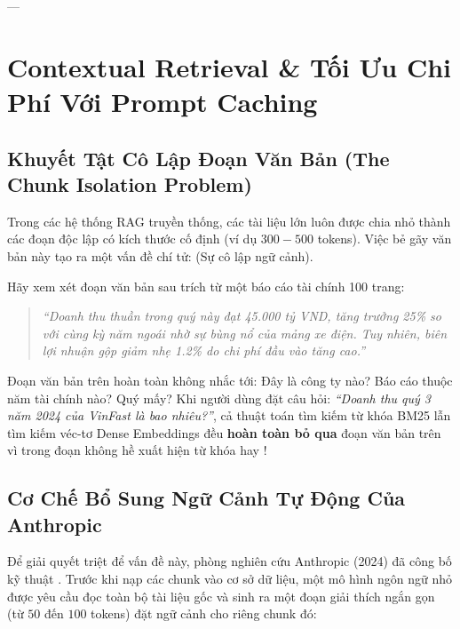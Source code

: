 ---

\section{Contextual Retrieval \& Tối Ưu Chi Phí Với Prompt Caching}
\label{sec:contextual-retrieval}

\subsection{Khuyết Tật Cô Lập Đoạn Văn Bản (The Chunk Isolation Problem)}
Trong các hệ thống RAG truyền thống, các tài liệu lớn luôn được chia nhỏ thành các đoạn độc lập có kích thước cố định (ví dụ $300 - 500$ tokens). Việc bẻ gãy văn bản này tạo ra một vấn đề chí tử:  (Sự cô lập ngữ cảnh).

Hãy xem xét đoạn văn bản sau trích từ một báo cáo tài chính 100 trang:
\begin{quote}\itshape
``Doanh thu thuần trong quý này đạt 45.000 tỷ VND, tăng trưởng 25\% so với cùng kỳ năm ngoái nhờ sự bùng nổ của mảng xe điện. Tuy nhiên, biên lợi nhuận gộp giảm nhẹ 1.2\% do chi phí đầu vào tăng cao.''
\end{quote}
Đoạn văn bản trên hoàn toàn không nhắc tới: Đây là công ty nào? Báo cáo thuộc năm tài chính nào? Quý mấy?
Khi người dùng đặt câu hỏi: \textit{``Doanh thu quý 3 năm 2024 của VinFast là bao nhiêu?''}, cả thuật toán tìm kiếm từ khóa BM25 lẫn tìm kiếm véc-tơ Dense Embeddings đều \textbf{hoàn toàn bỏ qua} đoạn văn bản trên vì trong đoạn không hề xuất hiện từ khóa  hay !

\subsection{Cơ Chế Bổ Sung Ngữ Cảnh Tự Động Của Anthropic}
Để giải quyết triệt để vấn đề này, phòng nghiên cứu Anthropic (2024) đã công bố kỹ thuật . Trước khi nạp các chunk vào cơ sở dữ liệu, một mô hình ngôn ngữ nhỏ được yêu cầu đọc toàn bộ tài liệu gốc và sinh ra một đoạn giải thích ngắn gọn (từ $50$ đến $100$ tokens) đặt ngữ cảnh cho riêng chunk đó:

